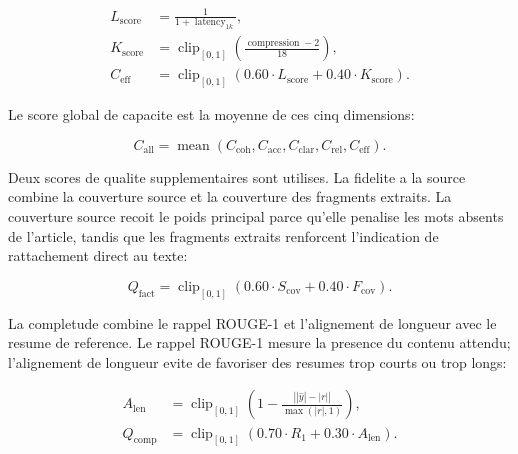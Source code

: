 \begin{align}
L_{\mathrm{score}} &= \frac{1}{1+\operatorname{latency}_{1k}}, \\
K_{\mathrm{score}} &= \operatorname{clip}_{[0,1]}\left(\frac{\operatorname{compression}-2}{18}\right), \\
C_{\mathrm{eff}} &= \operatorname{clip}_{[0,1]}(0.60 \cdot L_{\mathrm{score}} + 0.40 \cdot K_{\mathrm{score}}).
\label{eq:efficiency}
\end{align}

Le score global de capacite est la moyenne de ces cinq dimensions:

\begin{equation}
C_{\mathrm{all}} =
\operatorname{mean}(C_{\mathrm{coh}}, C_{\mathrm{acc}}, C_{\mathrm{clar}}, C_{\mathrm{rel}}, C_{\mathrm{eff}}).
\label{eq:capability-overall-application}
\end{equation}

Deux scores de qualite supplementaires sont utilises. La fidelite a la source combine la couverture source et la couverture des fragments extraits. La couverture source recoit le poids principal parce qu'elle penalise les mots absents de l'article, tandis que les fragments extraits renforcent l'indication de rattachement direct au texte:

\begin{equation}
Q_{\mathrm{fact}} =
\operatorname{clip}_{[0,1]}(0.60 \cdot S_{\mathrm{cov}} + 0.40 \cdot F_{\mathrm{cov}}).
\label{eq:factuality}
\end{equation}

La completude combine le rappel ROUGE-1 et l'alignement de longueur avec le resume de reference. Le rappel ROUGE-1 mesure la presence du contenu attendu; l'alignement de longueur evite de favoriser des resumes trop courts ou trop longs:

\begin{align}
A_{\mathrm{len}} &=
\operatorname{clip}_{[0,1]}\left(1-\frac{\left||\hat{y}|-|r|\right|}{\max(|r|,1)}\right), \\
Q_{\mathrm{comp}} &=
\operatorname{clip}_{[0,1]}(0.70 \cdot R_1 + 0.30 \cdot A_{\mathrm{len}}).
\label{eq:completeness}
\end{align}
